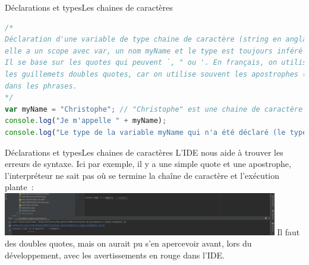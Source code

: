 \documentclass{beamer}
\begin{document}
\begin{frame}[fragile]{Déclarations et types}{Les chaines de caractères}
    \begin{lstlisting}[language=JavaScript,title={\scriptsize{Script JavaScript}}]
/*
Déclaration d'une variable de type chaine de caractère (string en anglais),
elle a un scope avec var, un nom myName et le type est toujours inféré par le langage.
Il se base sur les quotes qui peuvent `, " ou '. En français, on utilise souvent
les guillemets doubles quotes, car on utilise souvent les apostrophes (simple quote)
dans les phrases.
*/
var myName = "Christophe"; // "Christophe" est une chaine de caractère (string en anglais)
console.log("Je m'appelle " + myName);
console.log("Le type de la variable myName qui n'a été déclaré (le type) est " + typeof myName);
    \end{lstlisting}
\end{frame}

\begin{frame}{Déclarations et types}{Les chaines de caractères}
    L'IDE nous aide à trouver les erreurs de syntaxe.
    \bigbreak
    Ici par exemple, il y a une simple quote et une apostrophe, l'interpréteur ne sait pas où se termine la chaîne de caractère et l'exécution plante~:
    \bigbreak
    \centering
    \includegraphics[width=12cm]{image/wrong-quote}
    \pause
    \bigbreak
    \flushleft
    Il faut des doubles quotes, mais on aurait pu s'en apercevoir avant, lors du développement, avec les avertissements en rouge dans l'IDE.
\end{frame}
\end{document}
